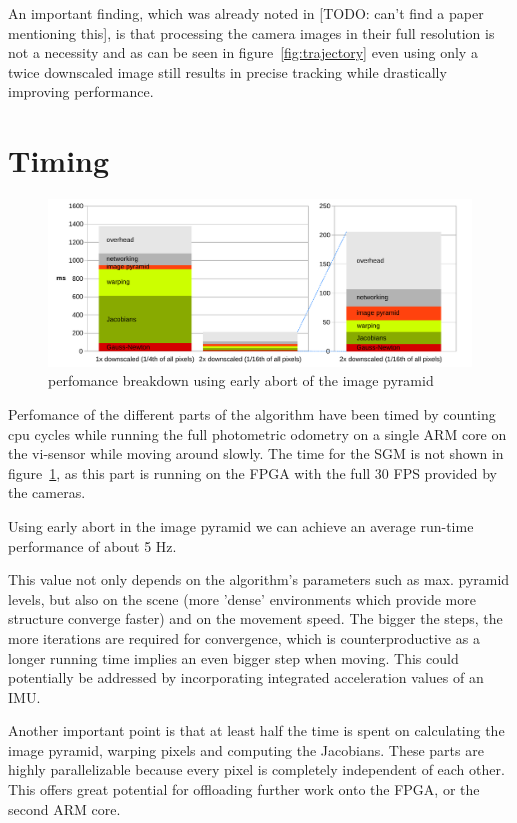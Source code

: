 An important finding, which was already noted in [TODO: can't find a paper
mentioning this], is that processing the camera images in their full resolution
is not a necessity and as can be seen in figure~\ref{fig:trajectory} even using
only a twice downscaled image still results in precise tracking while
drastically improving performance.


\section{Timing}
\label{sec:timing}

\begin{figure}
    \centering
    \includegraphics[width=\textwidth]{images/timing.pdf}
    \caption{perfomance breakdown using early abort of the image pyramid}
    \label{fig:timing}
\end{figure}

Perfomance of the different parts of the algorithm have been timed by counting
cpu cycles while running the full photometric odometry on a single ARM core on
the vi-sensor while moving around slowly. The time for the SGM is not shown in
figure~\ref{fig:timing}, as this part is running on the FPGA with the full 30
FPS provided by the cameras.

Using early abort in the image pyramid we can achieve an average run-time
performance of about 5 Hz.

This value not only depends on the algorithm's parameters such as max. pyramid
levels, but also on the scene (more 'dense' environments which provide more
structure converge faster) and on the movement speed. The bigger the steps, the
more iterations are required for convergence, which is counterproductive as a
longer running time implies an even bigger step when moving. This could
potentially be addressed by incorporating integrated acceleration values of an
IMU.

Another important point is that at least half the time is spent on calculating
the image pyramid, warping pixels and computing the Jacobians. These parts are
highly parallelizable because every pixel is completely independent of each
other. This offers great potential for offloading further work onto the FPGA,
or the second ARM core.
